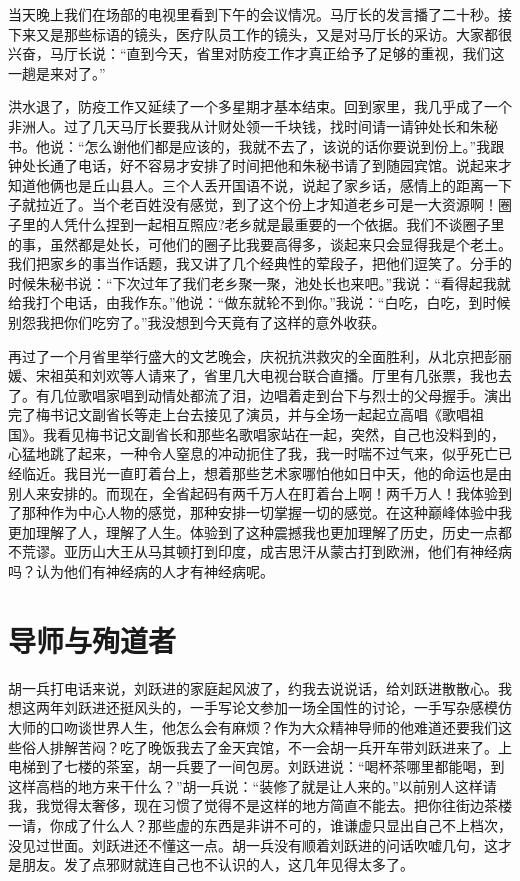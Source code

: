 \documentclass[12pt,oneside]{book}
\begin{document}
当天晚上我们在场部的电视里看到下午的会议情况。马厅长的发言播了二十秒。接下来又是那些标语的镜头，医疗队员工作的镜头，又是对马厅长的采访。大家都很兴奋，马厅长说：``直到今天，省里对防疫工作才真正给予了足够的重视，我们这一趟是来对了。''

洪水退了，防疫工作又延续了一个多星期才基本结束。回到家里，我几乎成了一个非洲人。过了几天马厅长要我从计财处领一千块钱，找时间请一请钟处长和朱秘书。他说：``怎么谢他们都是应该的，我就不去了，该说的话你要说到份上。''我跟钟处长通了电话，好不容易才安排了时间把他和朱秘书请了到随园宾馆。说起来才知道他俩也是丘山县人。三个人丢开国语不说，说起了家乡话，感情上的距离一下子就拉近了。当个老百姓没有感觉，到了这个份上才知道老乡可是一大资源啊！圈子里的人凭什么捏到一起相互照应?老乡就是最重要的一个依据。我们不谈圈子里的事，虽然都是处长，可他们的圈子比我要高得多，谈起来只会显得我是个老土。我们把家乡的事当作话题，我又讲了几个经典性的荤段子，把他们逗笑了。分手的时候朱秘书说：``下次过年了我们老乡聚一聚，池处长也来吧。''我说：``看得起我就给我打个电话，由我作东。''他说：``做东就轮不到你。''我说：``白吃，白吃，到时候别怨我把你们吃穷了。''我没想到今天竟有了这样的意外收获。

再过了一个月省里举行盛大的文艺晚会，庆祝抗洪救灾的全面胜利，从北京把彭丽媛、宋祖英和刘欢等人请来了，省里几大电视台联合直播。厅里有几张票，我也去了。有几位歌唱家唱到动情处都流了泪，边唱着走到台下与烈士的父母握手。演出完了梅书记文副省长等走上台去接见了演员，并与全场一起起立高唱《歌唱祖国》。我看见梅书记文副省长和那些名歌唱家站在一起，突然，自己也没料到的，心猛地跳了起来，一种令人窒息的冲动扼住了我，我一时喘不过气来，似乎死亡已经临近。我目光一直盯着台上，想着那些艺术家哪怕他如日中天，他的命运也是由别人来安排的。而现在，全省起码有两千万人在盯着台上啊！两千万人！我体验到了那种作为中心人物的感觉，那种安排一切掌握一切的感觉。在这种巅峰体验中我更加理解了人，理解了人生。体验到了这种震撼我也更加理解了历史，历史一点都不荒谬。亚历山大王从马其顿打到印度，成吉思汗从蒙古打到欧洲，他们有神经病吗？认为他们有神经病的人才有神经病呢。


\chapter{导师与殉道者}

胡一兵打电话来说，刘跃进的家庭起风波了，约我去说说话，给刘跃进散散心。我想这两年刘跃进还挺风头的，一手写论文参加一场全国性的讨论，一手写杂感模仿大师的口吻谈世界人生，他怎么会有麻烦？作为大众精神导师的他难道还要我们这些俗人排解苦闷？吃了晚饭我去了金天宾馆，不一会胡一兵开车带刘跃进来了。上电梯到了七楼的茶室，胡一兵要了一间包房。刘跃进说：``喝杯茶哪里都能喝，到这样高档的地方来干什么？''胡一兵说：``装修了就是让人来的。''以前别人这样请我，我觉得太奢侈，现在习惯了觉得不是这样的地方简直不能去。把你往街边茶楼一请，你成了什么人？那些虚的东西是非讲不可的，谁谦虚只显出自己不上档次，没见过世面。刘跃进还不懂这一点。胡一兵没有顺着刘跃进的问话吹嘘几句，这才是朋友。发了点邪财就连自己也不认识的人，这几年见得太多了。
\end{document}
